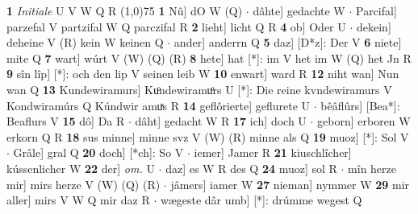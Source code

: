 \documentclass[8pt,a4paper,notitlepage]{article}
\begin{document}
\begin{table}[ht]
\begin{minipage}[t]{0.5\linewidth}
\textbf{1} \textit{Initiale} U V W Q R  \newline
\line(1,0){75} \newline
\textbf{1} Nû] dO W (Q)  $\cdot$ dâhte] gedachte W  $\cdot$ Parcifal] parzefal V partzifal W Q parczifal R \textbf{2} lieht] licht Q R \textbf{4} ob] Oder U  $\cdot$ dekein] deheine V (R) kein W keinen Q  $\cdot$ ander] anderrn Q \textbf{5} daz] [D*z]: Der V \textbf{6} niete] mite Q \textbf{7} wart] wúrt V (W) (Q) (R) \textbf{8} hete] hat [*]: im V het im W (Q) het Jn R \textbf{9} sîn lîp] [*]: och den lip V seinen leib W \textbf{10} enwart] ward R \textbf{12} niht wan] Nun wan Q \textbf{13} Kundewiramurs] Kuͦndewiramuͦrs U [*]: Die reine kvndewiramurs V Kondwiramúrs Q Kúndwir amuͯs R \textbf{14} geflôrierte] geflurete U  $\cdot$ bêâflûrs] [Bea*]: Beaflurs V \textbf{15} dô] Da R  $\cdot$ dâht] gedacht W R \textbf{17} ich] doch U  $\cdot$ geborn] erboren W erkorn Q R \textbf{18} sus minne] minne svz V (W) (R) minne als Q \textbf{19} muoz] [*]: Sol V  $\cdot$ Grâle] gral Q \textbf{20} doch] [*ch]: So V  $\cdot$ iemer] Jamer R \textbf{21} kiuschlîcher] kússenlicher W \textbf{22} der] \textit{om.} U  $\cdot$ daz] es W R des Q \textbf{24} muoz] sol R  $\cdot$ mîn herze mir] mirs herze V (W) (Q) (R)  $\cdot$ jâmers] iamer W \textbf{27} nieman] nymmer W \textbf{29} mir aller] mirs V W Q mir daz R  $\cdot$ wægeste dâr umb] [*]: drúmme wegest Q \newline
\end{minipage}
\end{table}
\end{document}
